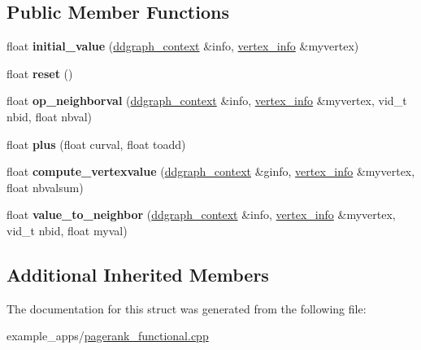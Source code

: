 \subsection*{Public Member Functions}
\begin{DoxyCompactItemize}
\item 
\hypertarget{structpagerank__kernel_a1c8a03bd758479e74e9116de1787f776}{float {\bfseries initial\-\_\-value} (\hyperlink{structddgraph_1_1ddgraph__context}{ddgraph\-\_\-context} \&info, \hyperlink{structddgraph_1_1vertex__info}{vertex\-\_\-info} \&myvertex)}\label{structpagerank__kernel_a1c8a03bd758479e74e9116de1787f776}

\item 
\hypertarget{structpagerank__kernel_ad9ac1fcbdcba06ca9a81a155333f365f}{float {\bfseries reset} ()}\label{structpagerank__kernel_ad9ac1fcbdcba06ca9a81a155333f365f}

\item 
\hypertarget{structpagerank__kernel_a83ed36d4260ea35549d4d60cd2ab94b1}{float {\bfseries op\-\_\-neighborval} (\hyperlink{structddgraph_1_1ddgraph__context}{ddgraph\-\_\-context} \&info, \hyperlink{structddgraph_1_1vertex__info}{vertex\-\_\-info} \&myvertex, vid\-\_\-t nbid, float nbval)}\label{structpagerank__kernel_a83ed36d4260ea35549d4d60cd2ab94b1}

\item 
\hypertarget{structpagerank__kernel_a664a391034ff4de9fc14fb737423a652}{float {\bfseries plus} (float curval, float toadd)}\label{structpagerank__kernel_a664a391034ff4de9fc14fb737423a652}

\item 
\hypertarget{structpagerank__kernel_a2d1625f82d432c3c177ee3536f5d076f}{float {\bfseries compute\-\_\-vertexvalue} (\hyperlink{structddgraph_1_1ddgraph__context}{ddgraph\-\_\-context} \&ginfo, \hyperlink{structddgraph_1_1vertex__info}{vertex\-\_\-info} \&myvertex, float nbvalsum)}\label{structpagerank__kernel_a2d1625f82d432c3c177ee3536f5d076f}

\item 
\hypertarget{structpagerank__kernel_ad2f774d1c47139d77ce9a0bcef70d3de}{float {\bfseries value\-\_\-to\-\_\-neighbor} (\hyperlink{structddgraph_1_1ddgraph__context}{ddgraph\-\_\-context} \&info, \hyperlink{structddgraph_1_1vertex__info}{vertex\-\_\-info} \&myvertex, vid\-\_\-t nbid, float myval)}\label{structpagerank__kernel_ad2f774d1c47139d77ce9a0bcef70d3de}

\end{DoxyCompactItemize}
\subsection*{Additional Inherited Members}


The documentation for this struct was generated from the following file\-:\begin{DoxyCompactItemize}
\item 
example\-\_\-apps/\hyperlink{pagerank__functional_8cpp}{pagerank\-\_\-functional.\-cpp}\end{DoxyCompactItemize}
